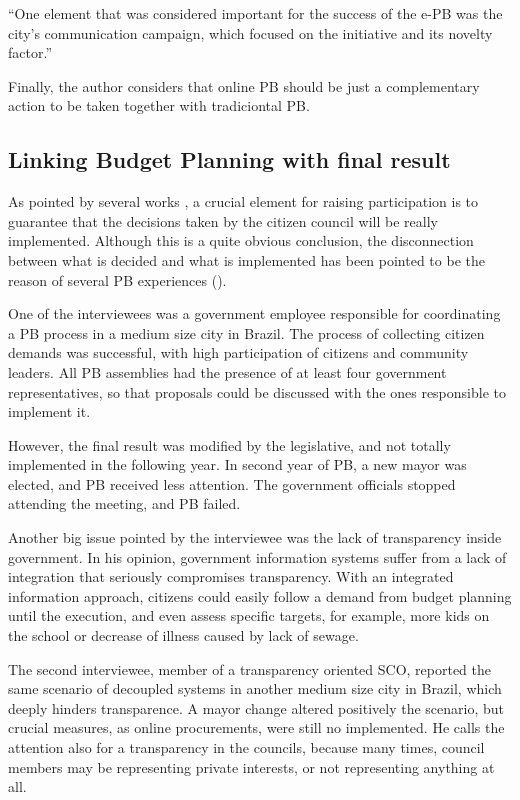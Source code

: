 ``One element that was considered important for the success of the e-PB was the city’s communication campaign, which focused on the initiative and its novelty factor.''

Finally, the author considers that online PB should be just a complementary action to be taken together with tradiciontal PB. 


\subsection{Linking Budget Planning with final result}
As pointed by several works \cite{Addor2012, Miller2014, TheWorldBank2001, Borges2012}, a crucial element for raising participation is to guarantee that the decisions taken by the citizen council will be really implemented. Although this is a quite obvious conclusion, the disconnection between what is decided and what is implemented has been pointed to be the reason of several PB experiences (\cite{Borges2012}).

One of the interviewees was a government employee responsible for coordinating a PB process in a medium size city in Brazil. The process of collecting citizen demands was successful, with high participation of citizens and community leaders. All PB assemblies had the presence of at least four government representatives, so that proposals could be discussed with the ones responsible to implement it. 

However, the final result was modified by the legislative, and not totally implemented in the following year. In second year of PB, a new mayor was elected, and PB received less attention. The government officials stopped attending the meeting, and PB failed.

Another big issue pointed by the interviewee was the lack of transparency inside government. In his opinion, government information systems suffer from a lack of integration that seriously compromises transparency. With an integrated information approach, citizens could easily follow a demand from budget planning until the execution, and even assess specific targets, for example, more kids on the school or decrease of illness caused by lack of sewage.

The second interviewee, member of a transparency oriented SCO, reported the same scenario of decoupled systems in another medium size city in Brazil, which deeply hinders transparence. A mayor change altered positively the scenario, but crucial measures, as online procurements, were still no implemented. He calls the attention also for a transparency in the councils, because many times, council members may be representing private interests, or not representing anything at all.

